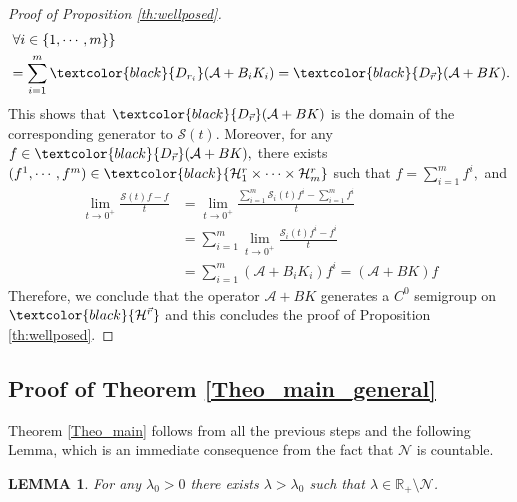 \documentclass[11pt, dvipsnames]{amsart}
\newtheorem{lem}[theorem]{LEMMA}
\begin{document}
\begin{proof}[Proof of Proposition \ref{th:wellposed}]
\begin{align*}
       &\left.\forall i\in \{1,\cdots,m\}\right\}\\
       &=\sum_{i=1}^m \textcolor{black}{D_{r_i}}(\mathcal{A}+B_iK_i)=\textcolor{black}{D_{\vec r}}(\mathcal{A}+BK).
   \end{align*}
   This shows that $\textcolor{black}{D_{\vec r}}(\mathcal{A}+BK)$ is the domain of the corresponding generator to $\mathcal{S}(t)$.
   Moreover, for any $f\in \textcolor{black}{D_{\vec r}}(\mathcal{A}+BK),$ there exists $(f^1,\cdots,f^m)\in \textcolor{black}{\mathcal{H}^{r}_1\times \cdots \times \mathcal{H}^{r}_m}$ such that $f=\sum_{i=1}^m f^i,$ and 
   \begin{align*}
       \lim_{t\rightarrow 0^+}\frac{ \mathcal{S}(t)f-f}{t}&=\lim_{t\rightarrow 0^+}\frac{\sum_{i=1}^m \mathcal{S}_i(t)f^i-\sum_{i=1}^m f^i}{t}\\
       &=\sum_{i=1}^m\lim_{t\rightarrow 0^+}\frac{\mathcal{S}_i(t)f^i-f^i}{t}\\
       &=\sum_{i=1}^m(\mathcal{A}+B_iK_i)f^i=(\mathcal{A}+BK)f
   \end{align*}
   Therefore, we conclude that the operator $\mathcal{A}+BK$ generates a $C^0$ semigroup on $\textcolor{black}{\mathcal{H}^{\vec r}}$ and this concludes the proof of Proposition \ref{th:wellposed}.
\end{proof}



\subsection{Proof of Theorem \ref{Theo_main_general}}
\label{sec:thm}
Theorem \ref{Theo_main} follows from all the previous steps and the following Lemma, which is an immediate consequence from the fact that $\mathcal{N}$ is countable.

\begin{lem}
\label{lem:lambda*}
    For any $\lambda_{0}>0$ there exists $\lambda>\lambda_{0}$ such that $\lambda\in\mathbb{R}_{+}\setminus\mathcal{N}$.
\end{lem}
\end{document}
